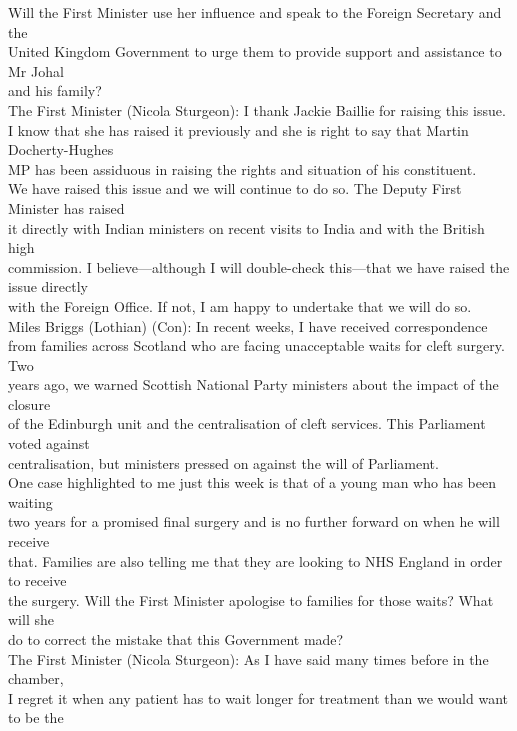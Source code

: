 \documentclass{article}
\begin{document}
\begin{description}
{Will the First Minister use her influence and speak to the Foreign Secretary and the\\
United Kingdom Government to urge them to provide support and assistance to Mr Johal\\
and his family?\\
The First Minister (Nicola Sturgeon): I thank Jackie Baillie for raising this issue.\\
I know that she has raised it previously and she is right to say that Martin Docherty-Hughes\\
MP has been assiduous in raising the rights and situation of his constituent.\\
We have raised this issue and we will continue to do so. The Deputy First Minister has raised\\
it directly with Indian ministers on recent visits to India and with the British high\\
commission. I believe—although I will double-check this—that we have raised the issue directly\\
with the Foreign Office. If not, I am happy to undertake that we will do so.\\
Miles Briggs (Lothian) (Con): In recent weeks, I have received correspondence\\
from families across Scotland who are facing unacceptable waits for cleft surgery. Two\\
years ago, we warned Scottish National Party ministers about the impact of the closure\\
of the Edinburgh unit and the centralisation of cleft services. This Parliament voted against\\
centralisation, but ministers pressed on against the will of Parliament.\\
One case highlighted to me just this week is that of a young man who has been waiting\\
two years for a promised final surgery and is no further forward on when he will receive\\
that. Families are also telling me that they are looking to NHS England in order to receive\\
the surgery. Will the First Minister apologise to families for those waits? What will she\\
do to correct the mistake that this Government made?\\
The First Minister (Nicola Sturgeon): As I have said many times before in the chamber,\\
I regret it when any patient has to wait longer for treatment than we would want to be the\\
}
\end{description}
\end{document}
